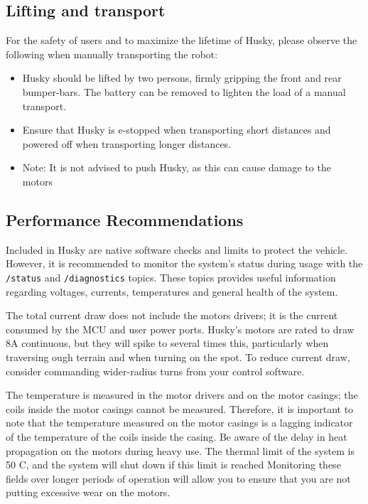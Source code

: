 \documentclass[]{clearpath-latex/clearpath-manual}
\begin{document}
\subsection{Lifting and transport}
For the safety of users and to maximize the lifetime of Husky, please observe the following when manually transporting the robot:

\begin{itemize}
		\item Husky should be lifted by two persons, firmly gripping the front and rear bumper-bars. 
		The battery can be removed to lighten the load of a manual transport.
		\item Ensure that Husky is e-stopped when transporting short distances and powered off when transporting 
		longer distances.
		\item Note: It is not advised to push Husky, as this can cause damage to the motors
\end{itemize}
\newpage
	
\subsection{Performance Recommendations}

Included in Husky are native software checks and limits to protect the vehicle. However, 
it is recommended to monitor the system’s status during usage with the \lstinline{/status} and \lstinline{/diagnostics} topics. 
These topics provides useful information regarding voltages, currents, temperatures and general health of the system.

The total current draw does not include the motors drivers; it is the current consumed by the MCU and user power ports. 
Husky’s motors are rated to draw 8A continuous, but they will spike to several times this, particularly when traversing 
ough terrain and when turning on the spot. To reduce current draw, consider commanding wider-radius turns from 
your control software.

The temperature is measured in the motor drivers and on the motor casings; the coils inside the motor casings cannot be measured.
Therefore, it is important to note that the temperature measured on the motor casings is a lagging indicator of 
the temperature of the coils inside the casing. Be aware of the delay in heat propagation on the motors during heavy use. 
The thermal limit of the system is 50 C\degree, and the system will shut down if this limit is reached
Monitoring these fields over longer periods of operation will allow you to ensure that you are not putting 
excessive wear on the motors.
\newpage
\end{document}
